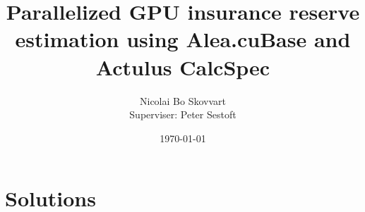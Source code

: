 \documentclass{llncs}
\title{Parallelized GPU insurance reserve estimation using Alea.cuBase and Actulus CalcSpec}
\author{Nicolai Bo Skovvart \email{nbsk@itu.dk}\\Superviser: Peter Sestoft}
\date{\today}
\institute{IT University of Copenhagen}
\begin{document}
	
		
	\maketitle

	
	\tableofcontents
	
	\newcommand\stdchapter{\chapter}
	\def\chapter*#1{\section*{#1}}
	\lstlistoflistings
	\let\chapter\stdchapter

	\listoffigures{}\thispagestyle{empty}
	\listoftables
	\clearpage	
	\setcounter{page}{1}
	
	

	\section{Solutions}
	
	
	
	

	
	
	
	
	
	
	
    \clearpage
	\appendix
	\addappheadtotoc
	
\end{document}

